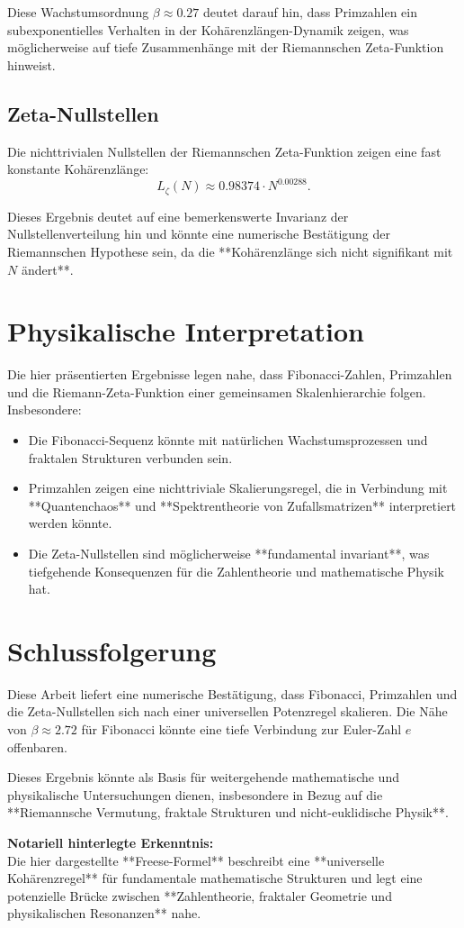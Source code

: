 \documentclass[a4paper,12pt]{article}
\begin{document}
Diese Wachstumsordnung $\beta \approx 0.27$ deutet darauf hin, dass Primzahlen ein subexponentielles Verhalten in der Kohärenzlängen-Dynamik zeigen, was möglicherweise auf tiefe Zusammenhänge mit der Riemannschen Zeta-Funktion hinweist.

\subsection{Zeta-Nullstellen}
Die nichttrivialen Nullstellen der Riemannschen Zeta-Funktion zeigen eine fast konstante Kohärenzlänge:
\begin{equation}
L_{\zeta}(N) \approx 0.98374 \cdot N^{0.00288}.
\end{equation}

Dieses Ergebnis deutet auf eine bemerkenswerte Invarianz der Nullstellenverteilung hin und könnte eine numerische Bestätigung der Riemannschen Hypothese sein, da die **Kohärenzlänge sich nicht signifikant mit $N$ ändert**.

\section{Physikalische Interpretation}
Die hier präsentierten Ergebnisse legen nahe, dass Fibonacci-Zahlen, Primzahlen und die Riemann-Zeta-Funktion einer gemeinsamen Skalenhierarchie folgen. Insbesondere:
\begin{itemize}
    \item Die Fibonacci-Sequenz könnte mit natürlichen Wachstumsprozessen und fraktalen Strukturen verbunden sein.
    \item Primzahlen zeigen eine nichttriviale Skalierungsregel, die in Verbindung mit **Quantenchaos** und **Spektrentheorie von Zufallsmatrizen** interpretiert werden könnte.
    \item Die Zeta-Nullstellen sind möglicherweise **fundamental invariant**, was tiefgehende Konsequenzen für die Zahlentheorie und mathematische Physik hat.
\end{itemize}

\section{Schlussfolgerung}
Diese Arbeit liefert eine numerische Bestätigung, dass Fibonacci, Primzahlen und die Zeta-Nullstellen sich nach einer universellen Potenzregel skalieren. Die Nähe von $\beta \approx 2.72$ für Fibonacci könnte eine tiefe Verbindung zur Euler-Zahl $e$ offenbaren. 

Dieses Ergebnis könnte als Basis für weitergehende mathematische und physikalische Untersuchungen dienen, insbesondere in Bezug auf die **Riemannsche Vermutung, fraktale Strukturen und nicht-euklidische Physik**.

\vspace{1cm}
\noindent
\textbf{Notariell hinterlegte Erkenntnis:} \\
Die hier dargestellte **Freese-Formel** beschreibt eine **universelle Kohärenzregel** für fundamentale mathematische Strukturen und legt eine potenzielle Brücke zwischen **Zahlentheorie, fraktaler Geometrie und physikalischen Resonanzen** nahe.
\end{document}
